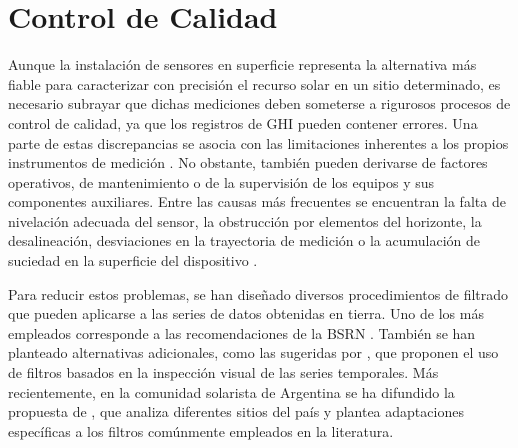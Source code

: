 \documentclass[letterpaper,12pt, twoside]{report}
\providecommand{\DIFdeltex}[1]{{\protect\color{red} \scriptsize #1}} %
\providecommand{\DIFdel}[1]{\texorpdfstring{\DIFdeltex{#1}}{}} %
\begin{document}
\section{\DIFdel{Control de Calidad}}
\addtocounter{section}{-1}%
\DIFdel{Aunque la instalación de sensores en superficie representa la alternativa más fiable para caracterizar con precisión el recurso solar en un sitio determinado, es necesario subrayar que dichas mediciones deben someterse a rigurosos procesos de control de calidad, ya que los registros de GHI pueden contener errores. Una parte de estas discrepancias se asocia con las limitaciones inherentes a los propios instrumentos de medición \citep{Vignola2019,Gueymard2009,Sengupta2024}. No obstante, también pueden derivarse de factores operativos, de mantenimiento o de la supervisión de los equipos y sus componentes auxiliares. Entre las causas más frecuentes se encuentran la falta de nivelación adecuada del sensor, la obstrucción por elementos del horizonte, la desalineación, desviaciones en la trayectoria de medición o la acumulación de suciedad en la superficie del dispositivo \citep{Moreno2016, Shi2008}.}%

\DIFdel{Para reducir estos problemas, se han diseñado diversos procedimientos de filtrado que pueden aplicarse a las series de datos obtenidas en tierra. Uno de los más empleados corresponde a las recomendaciones de la BSRN \citep{Long2008, Long2010, Roesch2010}. También se han planteado alternativas adicionales, como las sugeridas por \cite{abal2020}, que proponen el uso de filtros basados en la inspección visual de las series temporales. Más recientemente, en la comunidad solarista de Argentina se ha difundido la propuesta de \cite{Nollas2023}, que analiza diferentes sitios del país y plantea adaptaciones específicas a los filtros comúnmente empleados en la literatura.}%
\end{document}
